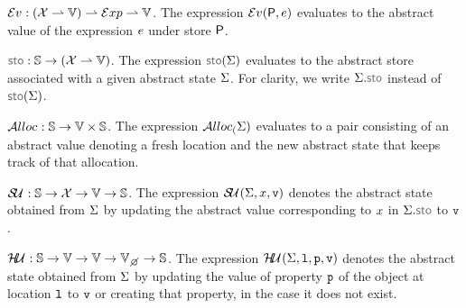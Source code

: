 \begin{description}
\setlength{\itemsep}{0.2em}
  \item[\jsil Expression Evaluation,] $\mathcal{E}v_{} :  (\mathcal{X} \rightharpoonup \mathbb{V})  \rightharpoonup \mathcal{E}xp \rightharpoonup \mathbb{V}$. 
  	The expression $\mathcal{E}v_{}({\sf P}, e)$ evaluates to the abstract value of the \jsil expression $e$ under store ${\sf P}$. 
            
  \item[Store Selector,] $\stosel : \absstates \rightarrow (\jvars \partialmap \absvals)$. The expression $\stosel(\absstate)$ evaluates to the abstract store associated with a given abstract state $\Sigma$. For clarity, we write $\absstate.\stosel$ instead of $\stosel(\absstate)$. 

  \item[Heap Allocation,] $\mathcal{A}lloc_{}: \mathbb{S} \rightarrow \mathbb{V} \times \mathbb{S}$.   The expression $\mathcal{A}lloc_{(}\Sigma)$ evaluates to a pair consisting
          of an abstract value denoting a fresh location and the new abstract state that keeps track of that allocation. %
%             
  \item[Store Update,] $\mathcal{S\!U}_{}: \mathbb{S} \rightarrow \mathcal{X} \rightarrow \mathbb{V} \rightarrow \mathbb{S}$. 
             The expression $\mathcal{S\!U}_{}(\Sigma, x, \mathtt{v})$ denotes the abstract state obtained from $\Sigma$ 
             by updating the abstract value corresponding to $x$ in $\absstate.\stosel$ to $\mathtt{v}$. 

   \item[Heap Update,] $\hpupdt{} : \absstates \rightarrow \absvals \rightarrow \absvals \rightarrow \setext{\absvals}{\none} \rightarrow \absstates$. 
             The expression $\mathcal{H\!U}_{}(\Sigma, \mathtt{l}, \mathtt{p}, \mathtt{v})$ denotes the abstract state obtained from $\Sigma$ 
             by updating the value of property $\mathtt{p}$ of the object at location $\mathtt{l}$ to $\mathtt{v}$ or creating that property, in the
             case it does not exist.
                   

\end{description}
